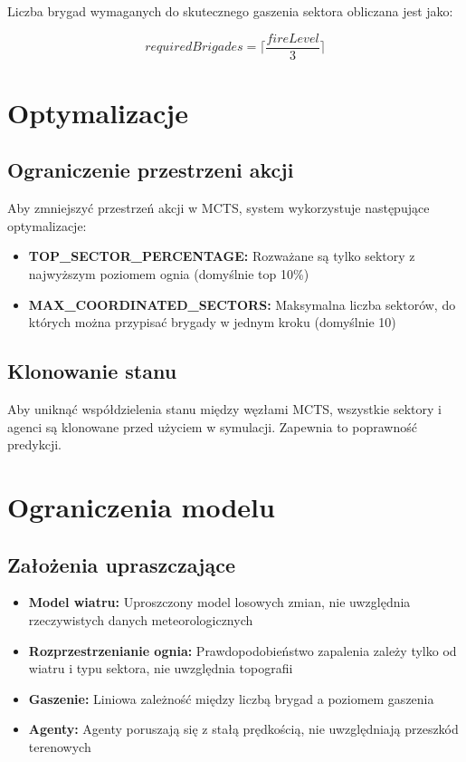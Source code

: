 \documentclass[11pt,a4paper]{article}
\begin{document}
Liczba brygad wymaganych do skutecznego gaszenia sektora obliczana jest jako:

\begin{equation}
requiredBrigades = \lceil \frac{fireLevel}{3} \rceil
\end{equation}

\section{Optymalizacje}

\subsection{Ograniczenie przestrzeni akcji}

Aby zmniejszyć przestrzeń akcji w MCTS, system wykorzystuje następujące optymalizacje:

\begin{itemize}
    \item \textbf{TOP\_SECTOR\_PERCENTAGE:} Rozważane są tylko sektory z najwyższym poziomem ognia (domyślnie top 10\%)
    \item \textbf{MAX\_COORDINATED\_SECTORS:} Maksymalna liczba sektorów, do których można przypisać brygady w jednym kroku (domyślnie 10)
\end{itemize}

\subsection{Klonowanie stanu}

Aby uniknąć współdzielenia stanu między węzłami MCTS, wszystkie sektory i agenci są klonowane przed użyciem w symulacji. Zapewnia to poprawność predykcji.

\section{Ograniczenia modelu}

\subsection{Założenia upraszczające}

\begin{itemize}
    \item \textbf{Model wiatru:} Uproszczony model losowych zmian, nie uwzględnia rzeczywistych danych meteorologicznych
    \item \textbf{Rozprzestrzenianie ognia:} Prawdopodobieństwo zapalenia zależy tylko od wiatru i typu sektora, nie uwzględnia topografii
    \item \textbf{Gaszenie:} Liniowa zależność między liczbą brygad a poziomem gaszenia
    \item \textbf{Agenty:} Agenty poruszają się z stałą prędkością, nie uwzględniają przeszkód terenowych
\end{itemize}
\end{document}
